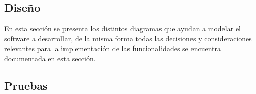 \clearpage
\subsection{Diseño}

 En esta sección se presenta los distintos diagramas que ayudan a modelar el
 software a desarrollar, de la misma forma todas las decisiones y consideraciones
 relevantes para la implementación de las funcionalidades se encuentra documentada
 en esta sección.

    

\subsection{Pruebas}

    

